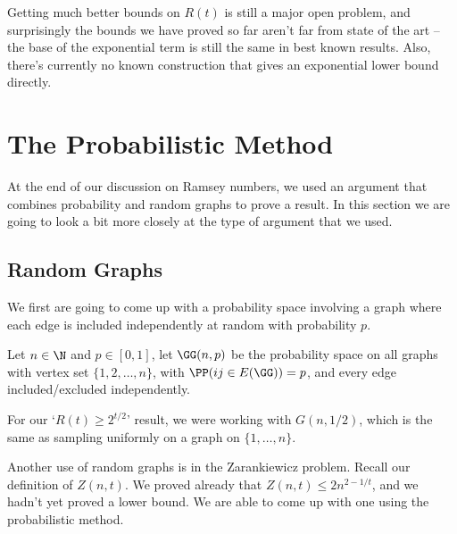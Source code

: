 \documentclass[a4paper]{scrartcl}
\begin{document}
Getting much better bounds on $R(t)$ is still a major open problem, and surprisingly the bounds we have proved so far aren't far from state of the art -- the base of the exponential term is still the same in best known results. Also, there's currently no known construction that gives an exponential lower bound directly.

\section{The Probabilistic Method}

At the end of our discussion on Ramsey numbers, we used an argument that combines probability and random graphs to prove a result. In this section we are going to look a bit more closely at the type of argument that we used.

\subsection{Random Graphs}

We first are going to come up with a probability space involving a graph where each edge is included independently at random with probability $p$.

\begin{definition}
	Let $n \in \N$ and $p \in [0, 1]$, let $\GG(n, p)$ be the probability space on all graphs with vertex set $\{1, 2, \dots, n\}$, with $\PP(ij \in E(\GG)) = p$, and every edge included/excluded independently.
\end{definition}

\begin{remark}
	For our `$R(t) \geq 2^{t/2}$' result, we were working with $G(n, 1/2)$, which is the same as sampling uniformly on a graph on $\{1, \dots, n\}$.
\end{remark}

Another use of random graphs is in the Zarankiewicz problem. Recall our definition of $Z(n, t)$. We proved already that $Z(n, t) \leq 2 n^{2 - 1/t}$, and we hadn't yet proved a lower bound. We are able to come up with one using the probabilistic method.
\end{document}
